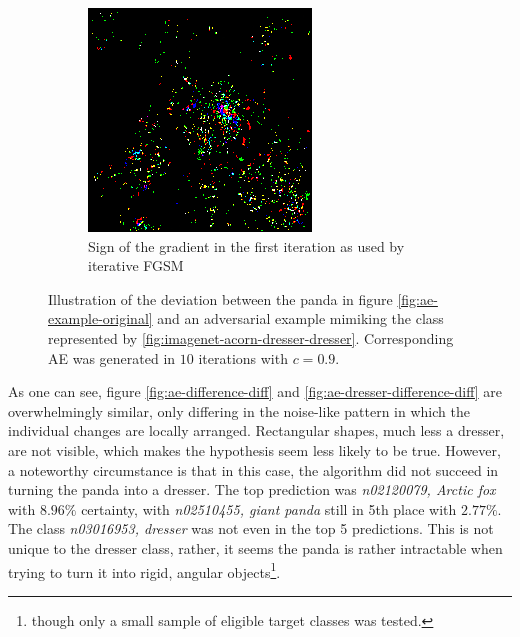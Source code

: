 \documentclass[11pt, a4paper]{article}
\begin{document}
\begin{figure}[h!tb]
\begin{subfigure}[t]{0.45\textwidth}
        \includegraphics[width=\textwidth]{aes/panda_dresser_10_0dot9_grad.png}
        \caption{Sign of the gradient in the first iteration as used by iterative FGSM}
        \label{fig:ae-dresser-difference-grad}
    \end{subfigure}
    \caption[Difference between original and a failed adversarial example]{Illustration of the deviation between the panda in figure \ref{fig:ae-example-original} and an adversarial example mimiking the class represented by \ref{fig:imagenet-acorn-dresser-dresser}. Corresponding AE was generated in $10$ iterations with $c = 0.9$.}
    \label{fig:ae-dresser-difference}
\end{figure}

As one can see, figure \ref{fig:ae-difference-diff} and \ref{fig:ae-dresser-difference-diff} are overwhelmingly similar, only differing in the noise-like pattern in which the individual changes are locally arranged. Rectangular shapes, much less a dresser, are not visible, which makes the hypothesis seem less likely to be true. However, a noteworthy circumstance is that in this case, the algorithm did not succeed in turning the panda into a dresser. The top prediction was \emph{n02120079, Arctic fox} with $8.96\%$ certainty, with \emph{n02510455, giant panda} still in 5th place with $2.77\%$. The class \emph{n03016953, dresser} was not even in the top 5 predictions. This is not unique to the dresser class, rather, it seems the panda is rather intractable when trying to turn it into rigid, angular objects\footnote{though only a small sample of eligible target classes was tested.}.
\end{document}
